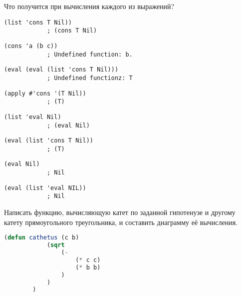 \documentclass[a4paper,oneside,12pt]{extreport}
\begin{document}
\begin{task}
	Что получится при вычисления каждого из выражений?
	\begin{AutoMultiColEnumerate}
		\item \begin{lstlisting}[style=lispinline, gobble=24]
			(list 'cons T Nil))
			; (cons T Nil)
		\end{lstlisting}

		\item \begin{lstlisting}[style=lispinline, gobble=24]
			(cons 'a (b c))
			; Undefined function: b.
		\end{lstlisting}

		\item \begin{lstlisting}[style=lispinline, gobble=24]
			(eval (eval (list 'cons T Nil)))
			; Undefined functionz: T
		\end{lstlisting}

		\item \begin{lstlisting}[style=lispinline, gobble=24]
			(apply #'cons '(T Nil))	
			; (T)
		\end{lstlisting}

		\item \begin{lstlisting}[style=lispinline, gobble=24]
			(list 'eval Nil)
			; (eval Nil)
		\end{lstlisting}

		\item \begin{lstlisting}[style=lispinline, gobble=24]
			(eval (list 'cons T Nil))
			; (T)
		\end{lstlisting}

		\item \begin{lstlisting}[style=lispinline, gobble=24]
			(eval Nil)
			; Nil
		\end{lstlisting}

		\item \begin{lstlisting}[style=lispinline, gobble=24]
			(eval (list 'eval NIL))
			; Nil
		\end{lstlisting}
	\end{AutoMultiColEnumerate}
\end{task}

\begin{task}
	Написать функцию, вычисляющую катет по заданной гипотенузе и другому катету прямоугольного треугольника, и составить диаграмму её вычисления.

	\begin{lstlisting}[language=Lisp, gobble=16]
		(defun cathetus (c b)
			(sqrt
				(-
					(* c c)
					(* b b)
				)
			)
		)
	\end{lstlisting}
\end{task}
\end{document}
